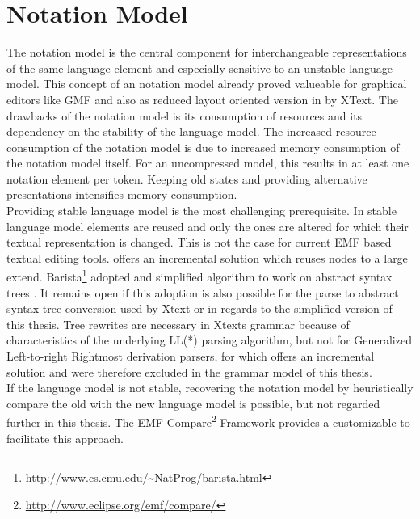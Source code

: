 \section{Notation Model} The notation model is the central component for interchangeable representations of the same language element and especially sensitive to an unstable language model. This concept of an notation model already proved valueable for graphical editors like GMF and also as reduced layout oriented version in by XText. The drawbacks of the notation model is its consumption of resources and its dependency on the stability of the language model. The increased resource consumption of the notation model is due to increased memory consumption of the notation model itself. For an uncompressed model, this results in at least one notation element per token. Keeping old states and providing alternative presentations intensifies memory consumption. \\ %
Providing stable language model is the most challenging prerequisite. In stable language model elements are reused and only the ones are altered for which their textual representation is changed. This is not the case for current EMF based textual editing tools. \cite{iSW} offers an incremental solution which reuses nodes to a large extend. Barista\footnote{\raggedright \url{http://www.cs.cmu.edu/~NatProg/barista.html}} adopted and simplified \cite{iSW} algorithm to work on abstract syntax trees \cite{Barista}. It remains open if this adoption is also possible for the parse to abstract syntax tree conversion used by Xtext or in regards to the simplified  version of this thesis. Tree rewrites are necessary in Xtexts grammar because of characteristics of the underlying LL(*) parsing algorithm, but not for Generalized Left-to-right Rightmost derivation parsers, for which \cite{iSW} offers an incremental solution and were therefore excluded in the grammar model of this thesis. \\%
If the language model is not stable, recovering the notation model by heuristically compare the old with the new language model is possible, but not regarded further in this thesis. The EMF Compare\footnote{\raggedright \url{http://www.eclipse.org/emf/compare/}} Framework provides a customizable  to facilitate this approach. \\
